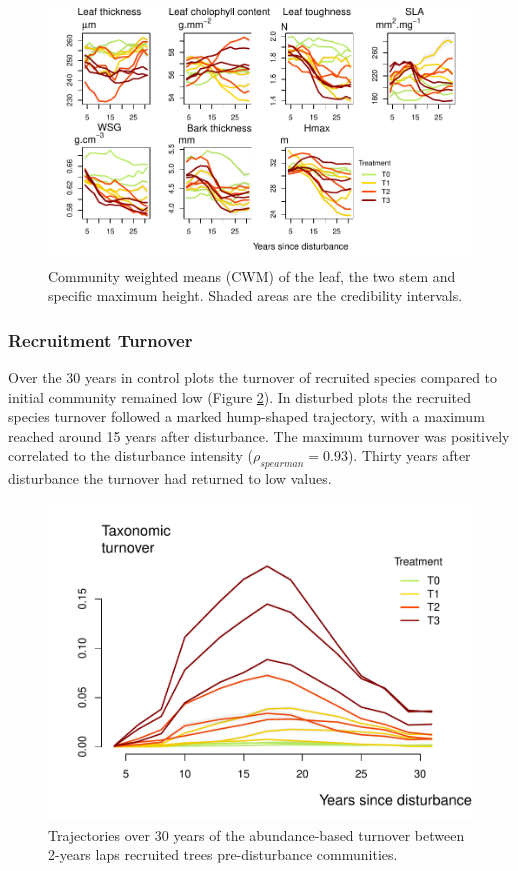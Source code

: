 \documentclass[
  11pt,
  french,
  A4paper,
  extrafontsizes,onecolumn,openright
  ]{memoir}
\begin{document}
\begin{figure}

{\centering \includegraphics[width=1\linewidth]{Manuscript_files/figure-latex/CWMbis-1} 

}

\caption{Community weighted means (CWM) of the leaf, the two stem and specific maximum height. Shaded areas are the credibility intervals.}\label{fig:CWMbis}
\end{figure}

\subsubsection{Recruitment Turnover}\label{recruitment-turnover}

Over the 30 years in control plots the turnover of recruited species
compared to initial community remained low (Figure \ref{fig:Turnover}).
In disturbed plots the recruited species turnover followed a marked
hump-shaped trajectory, with a maximum reached around 15 years after
disturbance. The maximum turnover was positively correlated to the
disturbance intensity (\(\rho_{spearman}=0.93\)). Thirty years after
disturbance the turnover had returned to low values.

\begin{figure}

{\centering \includegraphics[width=0.7\linewidth]{Manuscript_files/figure-latex/Turnover-1} 

}

\caption{Trajectories over 30 years of the abundance-based turnover between 2-years laps recruited trees pre-disturbance communities.}\label{fig:Turnover}
\end{figure}
\end{document}

